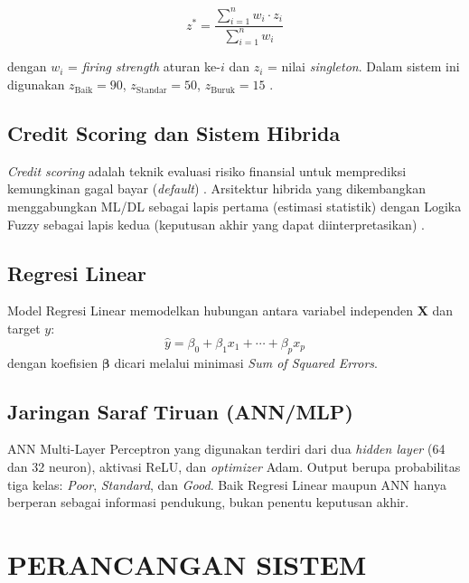 \documentclass[12pt,a4paper]{report}
\begin{document}
\begin{equation}
  z^{*} = \frac{\displaystyle\sum_{i=1}^{n} w_i \cdot z_i}
               {\displaystyle\sum_{i=1}^{n} w_i}
  \label{eq:sugeno}
\end{equation}

dengan $w_i$ = \textit{firing strength} aturan ke-$i$ dan
$z_i$ = nilai \textit{singleton}. Dalam sistem ini digunakan
$z_{\text{Baik}}=90$, $z_{\text{Standar}}=50$,
$z_{\text{Buruk}}=15$ \cite{booleancf_2018}.

\section{Credit Scoring dan Sistem Hibrida}

\textit{Credit scoring} adalah teknik evaluasi risiko finansial
untuk memprediksi kemungkinan gagal bayar (\textit{default})
\cite{rg_garcia_2024}. Arsitektur hibrida yang dikembangkan
menggabungkan ML/DL sebagai lapis pertama (estimasi statistik)
dengan Logika Fuzzy sebagai lapis kedua (keputusan akhir yang
dapat diinterpretasikan) \cite{taylorfrancis_2024}.

\section{Regresi Linear}

Model Regresi Linear memodelkan hubungan antara variabel
independen $\mathbf{X}$ dan target $y$:
\begin{equation}
  \hat{y} = \beta_0 + \beta_1 x_1 + \cdots + \beta_p x_p
\end{equation}
dengan koefisien $\boldsymbol{\beta}$ dicari melalui minimasi
\textit{Sum of Squared Errors}.

\section{Jaringan Saraf Tiruan (ANN/MLP)}

ANN Multi-Layer Perceptron yang digunakan terdiri dari dua
\textit{hidden layer} (64 dan 32 neuron), aktivasi ReLU, dan
\textit{optimizer} Adam. Output berupa probabilitas tiga kelas:
\textit{Poor}, \textit{Standard}, dan \textit{Good}. Baik
Regresi Linear maupun ANN hanya berperan sebagai informasi
pendukung, bukan penentu keputusan akhir.

\chapter{PERANCANGAN SISTEM}
\end{document}
